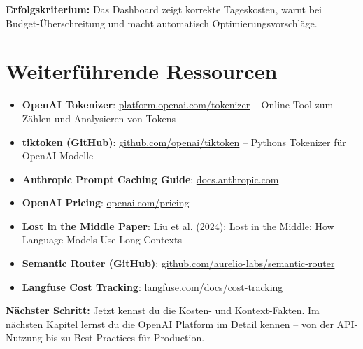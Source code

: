 \textbf{Erfolgskriterium:} Das Dashboard zeigt korrekte Tageskosten,
warnt bei Budget-Überschreitung und macht automatisch
Optimierungsvorschläge.

\section{Weiterführende Ressourcen}

\begin{itemize}[leftmargin=*]
    \item \textbf{OpenAI Tokenizer}: \href{https://platform.openai.com/tokenizer}{platform.openai.com/tokenizer}
    -- Online-Tool zum Zählen und Analysieren von Tokens
    \item \textbf{tiktoken (GitHub)}: \href{https://github.com/openai/tiktoken}{github.com/openai/tiktoken}
    -- Pythons Tokenizer für OpenAI-Modelle
    \item \textbf{Anthropic Prompt Caching Guide}: \href{https://docs.anthropic.com/en/docs/build-with-claude/prompt-caching}{docs.anthropic.com}
    \item \textbf{OpenAI Pricing}: \href{https://openai.com/pricing}{openai.com/pricing}
    \item \textbf{Lost in the Middle Paper}: Liu et al. (2024):
    \glqq Lost in the Middle: How Language Models Use Long Contexts\grqq
    \item \textbf{Semantic Router (GitHub)}: \href{https://github.com/aurelio-labs/semantic-router}{github.com/aurelio-labs/semantic-router}
    \item \textbf{Langfuse Cost Tracking}: \href{https://langfuse.com/docs/cost-tracking}{langfuse.com/docs/cost-tracking}
\end{itemize}

\textbf{Nächster Schritt:} Jetzt kennst du die Kosten- und Kontext-Fakten.
Im nächsten Kapitel lernst du die OpenAI Platform im Detail kennen -- von
der API-Nutzung bis zu Best Practices für Production.
